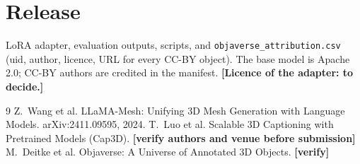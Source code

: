 \documentclass[11pt]{article}
\begin{document}
\section{Release}
LoRA adapter, evaluation outputs, scripts, and \texttt{objaverse\_attribution.csv} (uid, author, licence, URL for every CC-BY object). The base model is Apache 2.0; CC-BY authors are credited in the manifest. \textbf{[Licence of the adapter: to decide.]}

\begin{thebibliography}{9}
 Z.~Wang et al. LLaMA-Mesh: Unifying 3D Mesh Generation with Language Models. arXiv:2411.09595, 2024.
 T.~Luo et al. Scalable 3D Captioning with Pretrained Models (Cap3D). \textbf{[verify authors and venue before submission]}
 M.~Deitke et al. Objaverse: A Universe of Annotated 3D Objects. \textbf{[verify]}
\end{thebibliography}
\end{document}
